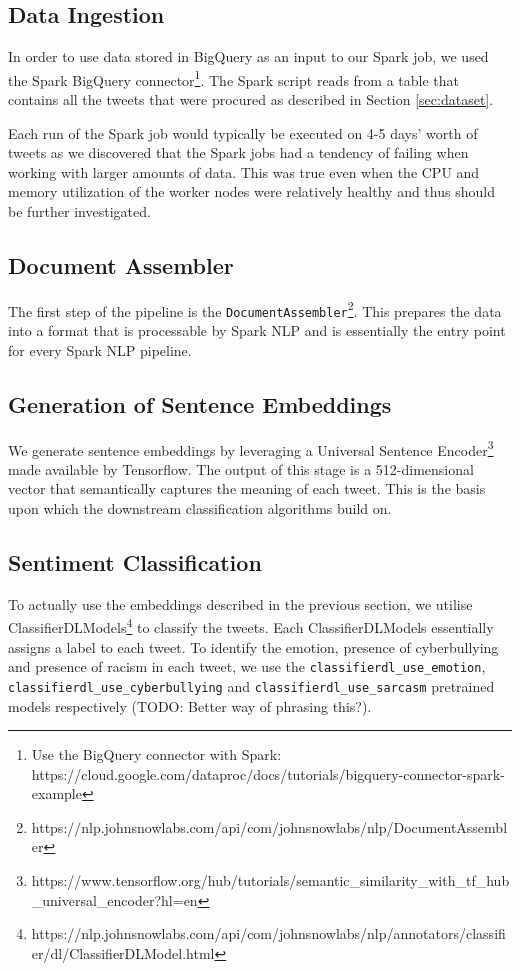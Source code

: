 \documentclass[a4paper,12pt]{article}
\begin{document}
\subsection{Data Ingestion}
In order to use data stored in BigQuery as an input to our Spark job, we used the Spark BigQuery connector\footnote{Use the BigQuery connector with Spark: https://cloud.google.com/dataproc/docs/tutorials/bigquery-connector-spark-example}. The Spark script reads from a table that contains all the tweets that were procured as described in Section \ref{sec:dataset}. 

Each run of the Spark job would typically be executed on 4-5 days' worth of tweets as we discovered that the Spark jobs had a tendency of failing when working with larger amounts of data. This was true even when the CPU and memory utilization of the worker nodes were relatively healthy and thus should be further investigated.

\subsection{Document Assembler}
The first step of the pipeline is the \texttt{DocumentAssembler}\footnote{https://nlp.johnsnowlabs.com/api/com/johnsnowlabs/nlp/DocumentAssembler}. This prepares the data into a format that is processable by Spark NLP and is essentially the entry point for every Spark NLP pipeline.

\subsection{Generation of Sentence Embeddings}
\label{sec:sentence-embeddings}
We generate sentence embeddings by leveraging a Universal Sentence Encoder\footnote{https://www.tensorflow.org/hub/tutorials/semantic\_similarity\_with\_tf\_hub\_universal\_encoder?hl=en} made available by Tensorflow. The output of this stage is a 512-dimensional vector that semantically captures the meaning of each tweet. This is the basis upon which the downstream classification algorithms build on.

\subsection{Sentiment Classification}
To actually use the embeddings described in the previous section, we utilise ClassifierDLModels\footnote{https://nlp.johnsnowlabs.com/api/com/johnsnowlabs/nlp/annotators/classifier/dl/ClassifierDLModel.html} to classify the tweets. Each ClassifierDLModels essentially assigns a label to each tweet. To identify the emotion, presence of cyberbullying and presence of racism in each tweet, we use the \texttt{classifierdl\_use\_emotion}, \texttt{classifierdl\_use\_cyberbullying} and \texttt{classifierdl\_use\_sarcasm} pretrained models respectively ({\color{red}TODO: Better way of phrasing this?}). 
\end{document}
